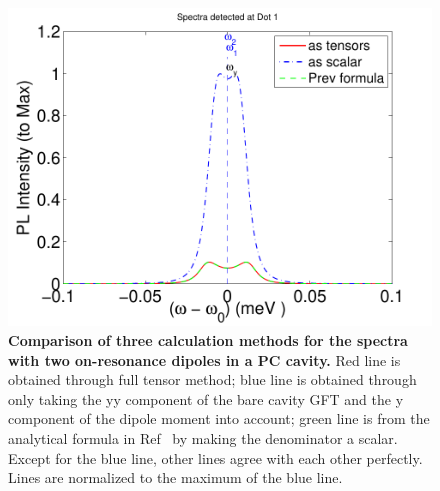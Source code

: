 \begin{figure}[H]
\centering
\begin{center}
\includegraphics[width=14cm]{./Figs/sp84_11_5}
\end{center}
\caption[Spectra of on-resonance dipoles, with three calculation method.]{\textbf{Comparison of three calculation methods for the spectra with two on-resonance dipoles in a PC cavity.} Red line is obtained through full tensor method; blue line is obtained through only taking the yy component of the bare cavity GFT and the y component of the dipole moment into account; green line is from the analytical formula in Ref~\cite{Yao2009c} by making the denominator a scalar. Except for the blue line, other lines agree with each other perfectly. Lines are normalized to the maximum of the blue line.}
\label{sp84_11_5}
\end{figure}


